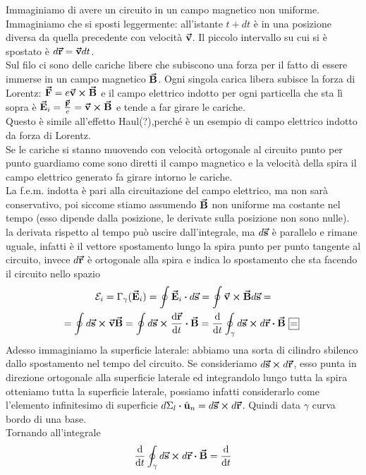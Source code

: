 \begin{demonstration}
	Immaginiamo di avere un circuito in un campo magnetico non uniforme. Immaginiamo che si sposti leggermente: all'istante $t+dt$ è in una posizione diversa da quella precedente con velocità $\vb*{\va{v}}$. Il piccolo intervallo su cui si è spostato è $d\vb*{\va{r}}=\vb*{\va{v}}dt$.\\
	Sul filo ci sono delle cariche libere che subiscono una forza per il fatto di essere immerse in un campo magnetico $\vb*{\va{B}}$. Ogni singola carica libera subisce la forza di Lorentz: $\vb*{\va{F}}=e\vb*{\va{v}}\cross\vb*{\va{B}} $ e il campo elettrico indotto per ogni particella che sta lì sopra è $\vb*{\va{E}}_i =\frac{\vb*{\va{F}}}{e}=\vb*{\va{v}}\cross\vb*{\va{B}}$ e tende a far girare le cariche.\\
	Questo è simile all'effetto Haul(?),perché è un esempio di campo elettrico indotto da forza di Lorentz.\\
	Se le cariche si stanno muovendo con velocità ortogonale al circuito	punto per punto guardiamo come sono diretti il campo magnetico e la velocità della spira	il campo elettrico generato fa girare intorno le cariche.\\
	La f.e.m. indotta è pari alla circuitazione del campo elettrico, ma non sarà conservativo, poi siccome stiamo assumendo $\vb*{\va{B}}$ non uniforme ma costante nel tempo (esso dipende dalla posizione, le derivate sulla posizione non sono nulle).\\
	la derivata rispetto al tempo può uscire dall'integrale, ma $d\vb*{\va{s}}$ è parallelo e rimane uguale, infatti è il vettore spostamento lungo la spira punto per punto tangente al circuito, invece	$d\vb*{\va{r}} $ è ortogonale alla spira e indica lo spostamento che sta facendo il circuito nello spazio	
	\begin{gather*}
		\mathcal{E}_i=\Gamma_\gamma(\vba E_i)=\oint\vba E_i\vdot d\vba s=\oint \vba v\cross\vba B d\vba s=\\
		=\oint d\vba s\cross\vba v\vba B=\oint d\vba s\cross\dv{\vba r}{t}\vdot\vba B= \dv{t}\oint_\gamma d\vba s\cross d\vba r\vdot\vba B\squarequal
	\end{gather*}
	Adesso immaginiamo la superficie laterale: abbiamo una sorta di cilindro sbilenco dallo spostamento nel tempo del circuito.
	Se consideriamo $d\vb*{\va{s}}\cross d\vb*{\va{r}}$, esso punta in direzione ortogonale alla superficie laterale ed integrandolo lungo tutta la spira otteniamo tutta la superficie laterale, possiamo infatti considerarlo come l'elemento infinitesimo di superficie $d\Sigma_l\vdot\vbh u_n=d\vba s\cross d\vba r$. Quindi data $\gamma$ curva bordo di una base.\\
	Tornando all'integrale 
	\begin{gather*}
		\dv{t}\oint_\gamma d\vba s\cross d\vba r\vdot \vba B=\dv{t}
	\end{gather*}
\end{demonstration}
